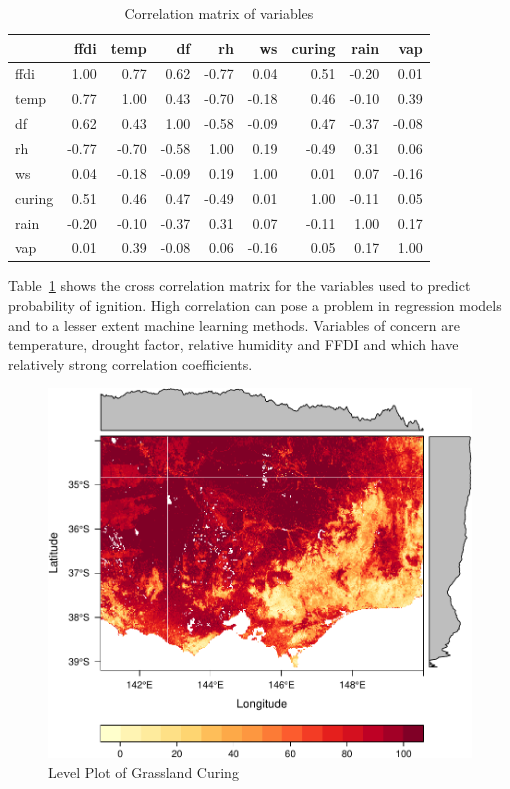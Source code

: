 \documentclass[11pt,a4paper]{article}
\begin{document}
\begin{table}
  \centering
  \begin{tabular}{lrrrrrrrr}
    \toprule
           & ffdi  & temp  & df    & rh    & ws    & curing & rain  & vap \\
    \midrule
    ffdi   & 1.00  & 0.77  & 0.62  & -0.77 & 0.04  & 0.51   & -0.20 & 0.01 \\
    temp   & 0.77  & 1.00  & 0.43  & -0.70 & -0.18 & 0.46   & -0.10 & 0.39 \\
    df     & 0.62  & 0.43  & 1.00  & -0.58 & -0.09 & 0.47   & -0.37 & -0.08 \\
    rh     & -0.77 & -0.70 & -0.58 & 1.00  & 0.19  & -0.49  & 0.31  & 0.06 \\
    ws     & 0.04  & -0.18 & -0.09 & 0.19  & 1.00  & 0.01   & 0.07  & -0.16 \\
    curing & 0.51  & 0.46  & 0.47  & -0.49 & 0.01  & 1.00   & -0.11 & 0.05 \\
    rain   & -0.20 & -0.10 & -0.37 & 0.31  & 0.07  & -0.11  & 1.00  & 0.17 \\
    vap    & 0.01  & 0.39  & -0.08 & 0.06  & -0.16 & 0.05   & 0.17  & 1.00 \\
    \bottomrule
  \end{tabular}
  \caption{Correlation matrix of variables}
  \label{table:correl}
\end{table}

Table~\ref{table:correl} shows the cross correlation matrix for the variables used to predict probability of ignition. High correlation can pose a problem in regression models and to a lesser extent machine learning methods. Variables of concern are temperature, drought factor, relative humidity and FFDI and  which have relatively strong correlation coefficients.


\begin{figure}
  \centering
	\includegraphics[width=.8\textwidth]{figures/cur_lp.pdf}
  \caption{Level Plot of Grassland Curing }
  \label{fig:cur_lp}
\end{figure}
\end{document}
